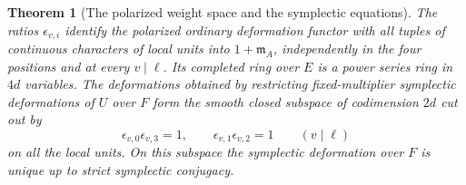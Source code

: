 \documentclass[a4paper,11pt]{article}
\newtheorem{theorem}[proposition]{Theorem}
\theoremstyle{definition}
\theoremstyle{remark}
\numberwithin{equation}{section}
\begin{document}
\begin{theorem}[The polarized weight space and the symplectic equations]
\leavevmode\label{thm:polarweights593}
The ratios \(\epsilon_{v,i}\) identify the polarized ordinary
deformation functor with all tuples of continuous characters
of local units into \(1+\mathfrak m_A\), independently in
the four positions and at every \(v\mid\ell\). Its completed
ring over \(E\) is a power series ring in \(4d\) variables.
The deformations obtained by restricting fixed-multiplier
symplectic deformations of \(U\) over \(F\) form the smooth
closed subspace of codimension \(2d\) cut out by
\[
       \epsilon_{v,0}\epsilon_{v,3}=1,\qquad
       \epsilon_{v,1}\epsilon_{v,2}=1 \qquad (v\mid\ell)
\]
on all the local units. On this subspace the symplectic
deformation over \(F\) is unique up to strict symplectic
conjugacy.
\end{theorem}
\end{document}
